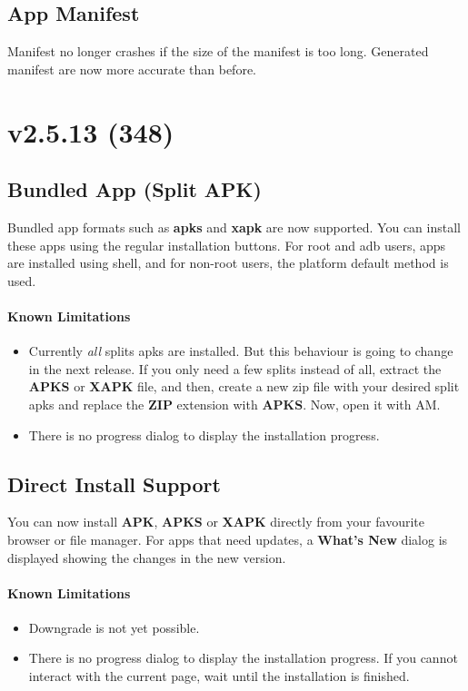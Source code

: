 \subsection{App Manifest}
Manifest no longer crashes if the size of the manifest is too long. Generated manifest are now more accurate than before.


\section{v2.5.13 (348)}

\subsection{Bundled App (Split APK)}
Bundled app formats such as \textbf{apks} and \textbf{xapk} are now supported. You can install these apps using
the regular installation buttons. For root and adb users, apps are installed using shell, and for non-root users,
the platform default method is used.

\paragraph{Known Limitations}
\begin{itemize}
    \item Currently \textit{all} splits apks are installed. But this behaviour is going to change in the next release.
    If you only need a few splits instead of all, extract the \textbf{APKS} or \textbf{XAPK} file, and then, create a new zip
    file with your desired split apks and replace the \textbf{ZIP} extension with \textbf{APKS}. Now, open it with AM\@.
    \item There is no progress dialog to display the installation progress.
\end{itemize}

\subsection{Direct Install Support}
You can now install \textbf{APK}, \textbf{APKS} or \textbf{XAPK} directly from your favourite browser or file manager.
For apps that need updates, a \textbf{What's New} dialog is displayed showing the changes in the new version.

\paragraph{Known Limitations}
\begin{itemize}
    \item Downgrade is not yet possible.
    \item There is no progress dialog to display the installation progress. If you cannot interact with the current page,
    wait until the installation is finished.
\end{itemize}

